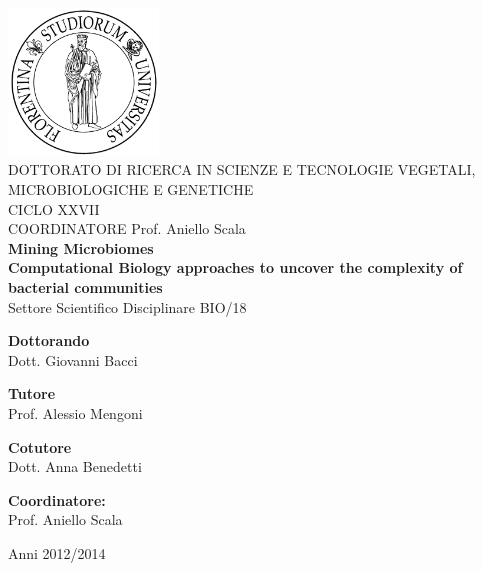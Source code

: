 \newcommand{\HRule}{\rule{\linewidth}{0.5mm}}

\makeatletter %
\begin{titlepage}
\begin{center}
{\includegraphics[width=0.3\textwidth]{./figures/logo_unifi}}\\[1cm]
{\large DOTTORATO DI RICERCA IN SCIENZE E TECNOLOGIE VEGETALI, MICROBIOLOGICHE E GENETICHE}\\[0.5cm]
{\small CICLO XXVII}\\[1cm]
{\small COORDINATORE Prof. Aniello Scala}\\[1cm]

{\large \textbf{Mining Microbiomes\\Computational Biology approaches to uncover the complexity of bacterial communities}}\\[1cm]
{\small Settore Scientifico Disciplinare BIO/18}\\[1cm]

{\small
\noindent
\begin{minipage}{0.4\textwidth}
\begin{center}
\textbf{Dottorando}\\
Dott. Giovanni Bacci
\end{center}
\end{minipage}%
\begin{minipage}{0.4\textwidth}
\begin{center}
\textbf{Tutore}\\
Prof. Alessio Mengoni
\end{center}
\begin{center} 
\textbf{Cotutore}\\
Dott. Anna Benedetti
\end{center}
\end{minipage}


\vspace{0.5cm}
{\textbf{Coordinatore:}\\Prof. Aniello Scala}\\
}
\vfill


{\small Anni 2012/2014}
\end{center}

\end{titlepage}
\makeatother